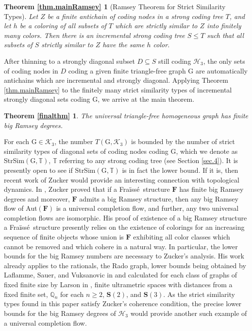 \documentclass{amsart}
\newtheorem*{thmR2}{Theorem \ref{thm.mainRamsey}}
\newtheorem*{thmfinalthm}{Theorem \ref{finalthm}}
\theoremstyle{remark}
\theoremstyle{definition}
\theoremstyle{remark}
\newcommand{\sse}{\subseteq}
\newcommand{\bQ}{\mathbb{Q}}
\newcommand{\bT}{\mathbb{T}}
\newcommand{\G}{\mathrm{G}}
\newcommand{\Fraisse}{Fra{\"{i}}ss{\'{e}}}
\begin{document}
\begin{thmR2}
[Ramsey Theorem for Strict Similarity Types]
Let $Z$ be a finite antichain of coding nodes in a strong coding tree $T$,
and let $h$ be a coloring of all subsets of $T$ which are strictly similar to $Z$ into finitely many colors.
Then  there is an incremental strong coding tree $S\le T$ such that all  subsets of $S$
strictly similar to  $Z$  have the same $h$ color.
\end{thmR2}



After thinning to a strongly diagonal subset $D\sse S$  still coding $\mathcal{H}_3$,
the only sets of coding nodes in $D$ coding a given finite triangle-free graph $\G$ are automatically antichains which are incremental and strongly diagonal.
Applying  Theorem \ref{thm.mainRamsey} to the finitely many strict similarity types of incremental strongly diagonal sets  coding $\G$, we arrive at the main theorem.
\begin{thmfinalthm}
The universal triangle-free  homogeneous graph has finite big Ramsey degrees.
\end{thmfinalthm}


For each $\G\in\mathcal{K}_3$,
the number $T(\G,\mathcal{K}_3)$
is bounded by  the number   of strict similarity types of diagonal sets of coding nodes coding $\G$, which we denote as StrSim$(\G,\bT)$, $\bT$ referring to any strong coding tree (see Section \ref{sec.4}).
It is  presently open to see if StrSim$(\G,\bT)$ is in fact the lower bound.
If  it is, then recent work of Zucker  would provide an interesting connection with topological dynamics.
In \cite{Zucker19},
Zucker proved that
if  a  \Fraisse\ structure  $\mathbf{F}$ has finite big Ramsey degrees and moreover, $\mathbf{F}$  admits a big Ramsey structure,
then
any big Ramsey flow of Aut$(\mathbf{F})$ is a universal completion flow, and further,  any two universal completion flows are isomorphic.
His proof of  existence  of a big Ramsey structure  a \Fraisse\ structure presently
relies on the existence of  colorings for an increasing sequence of finite objects whose union is $\mathbf{F}$ exhibiting all color classes which cannot be removed and which cohere in a  natural  way.
In particular, the lower bounds for the big Ramsey numbers are necessary to Zucker's analysis.
His work already applies to the rationals,  the Rado graph,  lower bounds being obtained by Laflamme, Sauer, and Vuksanovic in \cite{Laflamme/Sauer/Vuksanovic06} and calculated for each class of graphs of fixed finite size by Larson in \cite{Larson08},
finite ultrametric spaces with distances  from a fixed finite set,
 $\bQ_n$ for each $n\ge 2$, $\mathbf{S}(2)$, and $\mathbf{S}(3)$.
As the strict similarity types found in this paper satisfy Zucker's  coherence condition,
the precise lower bounds for the big Ramsey degrees of $\mathcal{H}_3$ would provide another such example of a universal completion flow.
\end{document}
